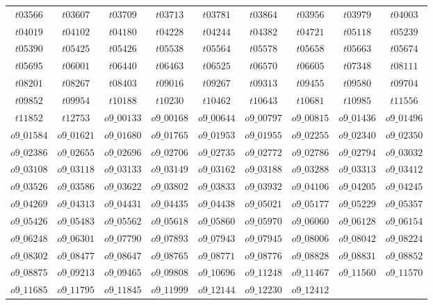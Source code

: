 \documentclass{amsart} %
\theoremstyle{thm}
\theoremstyle{definition}
\numberwithin{equation}{section}
\begin{document}
\begin{table}[htbp]
{\begin{tabular}{ccccccccc}
 $t03566$&
 $t03607$&
 $t03709$&
 $t03713$&
 $t03781$&
 $t03864$&
 $t03956$&
 $t03979$&
 $t04003$\\
 $t04019$&
 $t04102$&
 $t04180$&
 $t04228$&
 $t04244$&
 $t04382$&
 $t04721$&
 $t05118$&
 $t05239$\\
 $t05390$&
 $t05425$&
 $t05426$&
 $t05538$&
 $t05564$&
 $t05578$&
 $t05658$&
 $t05663$&
 $t05674$\\
 $t05695$&
 $t06001$&
 $t06440$&
 $t06463$&
 $t06525$&
 $t06570$&
 $t06605$&
 $t07348$&
 $t08111$\\
 $t08201$&
 $t08267$&
 $t08403$&
 $t09016$&
 $t09267$&
 $t09313$&
 $t09455$&
 $t09580$&
 $t09704$\\
 $t09852$&
 $t09954$&
 $t10188$&
 $t10230$&
 $t10462$&
 $t10643$&
 $t10681$&
 $t10985$&
 $t11556$\\
 $t11852$&
 $t12753$&
 $o9\_00133$&
 $o9\_00168$&
 $o9\_00644$&
 $o9\_00797$&
 $o9\_00815$&
 $o9\_01436$&
 $o9\_01496$\\
 $o9\_01584$&
 $o9\_01621$&
 $o9\_01680$&
 $o9\_01765$&
 $o9\_01953$&
 $o9\_01955$&
 $o9\_02255$&
 $o9\_02340$&
 $o9\_02350$\\
 $o9\_02386$&
 $o9\_02655$&
 $o9\_02696$&
 $o9\_02706$&
 $o9\_02735$&
 $o9\_02772$&
 $o9\_02786$&
 $o9\_02794$&
 $o9\_03032$\\
 $o9\_03108$&
 $o9\_03118$&
 $o9\_03133$&
 $o9\_03149$&
 $o9\_03162$&
 $o9\_03188$&
 $o9\_03288$&
 $o9\_03313$&
 $o9\_03412$\\
 $o9\_03526$&
 $o9\_03586$&
 $o9\_03622$&
 $o9\_03802$&
 $o9\_03833$&
 $o9\_03932$& 
 $o9\_04106$&
 $o9\_04205$&
 $o9\_04245$\\
 $o9\_04269$&
 $o9\_04313$&
 $o9\_04431$&
 $o9\_04435$&
 $o9\_04438$&
 $o9\_05021$&
 $o9\_05177$&
 $o9\_05229$&
 $o9\_05357$\\
 $o9\_05426$&
 $o9\_05483$&
 $o9\_05562$&
 $o9\_05618$&
 $o9\_05860$&
 $o9\_05970$&
 $o9\_06060$&
 $o9\_06128$&
 $o9\_06154$\\
 $o9\_06248$&
 $o9\_06301$&
 $o9\_07790$&
 $o9\_07893$&
 $o9\_07943$&
 $o9\_07945$&
 $o9\_08006$&
 $o9\_08042$&
 $o9\_08224$\\
 $o9\_08302$&
 $o9\_08477$&
 $o9\_08647$&
 $o9\_08765$&
 $o9\_08771$&
 $o9\_08776$&
 $o9\_08828$&
 $o9\_08831$&
 $o9\_08852$\\
 $o9\_08875$&
 $o9\_09213$&
 $o9\_09465$&
 $o9\_09808$&
 $o9\_10696$&
 $o9\_11248$&
 $o9\_11467$&
 $o9\_11560$&
 $o9\_11570$\\
 $o9\_11685$&
 $o9\_11795$&
 $o9\_11845$&
 $o9\_11999$&
 $o9\_12144$&
 $o9\_12230$&
 $o9\_12412$&

\end{tabular}}
\end{table}
\end{document}
